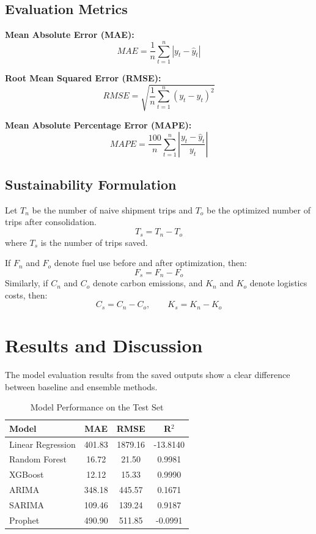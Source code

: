 \documentclass[12pt,a4paper]{article}
\begin{document}
\subsection{Evaluation Metrics}
\textbf{Mean Absolute Error (MAE):}
\[
MAE = \frac{1}{n}\sum_{t=1}^{n}|y_t - \hat{y}_t|
\]

\textbf{Root Mean Squared Error (RMSE):}
\[
RMSE = \sqrt{\frac{1}{n}\sum_{t=1}^{n}(y_t - \hat{y}_t)^2}
\]

\textbf{Mean Absolute Percentage Error (MAPE):}
\[
MAPE = \frac{100}{n}\sum_{t=1}^{n}\left|\frac{y_t - \hat{y}_t}{y_t}\right|
\]

\subsection{Sustainability Formulation}
Let $T_n$ be the number of naive shipment trips and $T_o$ be the optimized number of trips after consolidation.
\[
T_s = T_n - T_o
\]
where $T_s$ is the number of trips saved.

If $F_n$ and $F_o$ denote fuel use before and after optimization, then:
\[
F_s = F_n - F_o
\]
Similarly, if $C_n$ and $C_o$ denote carbon emissions, and $K_n$ and $K_o$ denote logistics costs, then:
\[
C_s = C_n - C_o,\qquad K_s = K_n - K_o
\]

\section{Results and Discussion}
The model evaluation results from the saved outputs show a clear difference between baseline and ensemble methods.

\begin{table}[H]
\centering
\caption{Model Performance on the Test Set}
\renewcommand{\arraystretch}{1.2}
\begin{tabular}{lccc}
\toprule
\textbf{Model} & \textbf{MAE} & \textbf{RMSE} & \textbf{R$^2$} \\
\midrule
Linear Regression & 401.83 & 1879.16 & -13.8140 \\
Random Forest & 16.72 & 21.50 & 0.9981 \\
XGBoost & 12.12 & 15.33 & 0.9990 \\
ARIMA & 348.18 & 445.57 & 0.1671 \\
SARIMA & 109.46 & 139.24 & 0.9187 \\
Prophet & 490.90 & 511.85 & -0.0991 \\
\bottomrule
\end{tabular}
\end{table}
\end{document}
